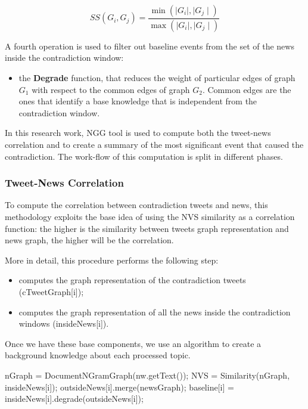 \begin{equation}
 SS(G_i,G_j)=\frac{\min(\mid G_i \mid, \mid G_j \mid)}{\max(\mid G_i \mid, \mid G_j \mid)}
\end{equation}

A fourth operation is used to filter out baseline events from the set of the news inside the contradiction window:
\begin{itemize}
 	\item the \textbf{Degrade} function, that reduces the weight of particular edges of graph $G_1$ with respect to the common edges of graph $G_2$. Common edges are the ones that identify a base knowledge that is independent from the contradiction window.
\end{itemize}

In this research work, NGG tool is used to compute both the tweet-news correlation and to create a summary of the most significant event that caused the contradiction. 
The work-flow of this computation is split in different phases.

\subsubsection*{Tweet-News Correlation}
To compute the correlation between contradiction tweets and news, this methodology exploits the base idea of using the NVS similarity as a correlation function: the higher is the similarity between tweets graph representation and news graph, the higher will be the correlation.

More in detail, this procedure performs the following step:
\begin{itemize}
	\item computes the graph representation of the contradiction tweets (cTweetGraph[i]);
	\item computes the  graph representation of all the news inside the contradiction windows (insideNews[i]).
\end{itemize}

Once we have these base components, we use an algorithm to create a background knowledge about each processed topic.

\begin{algorithmic}
		\STATE nGraph = DocumentNGramGraph(nw.getText());
		\STATE NVS = Similarity(nGraph, insideNews[i]);
			\STATE outsideNews[i].merge(newsGraph);
		\ENDIF
	\ENDIF
\ENDFOR
\STATE baseline[i] = insideNews[i].degrade(outsideNews[i]);
\end{algorithmic}


